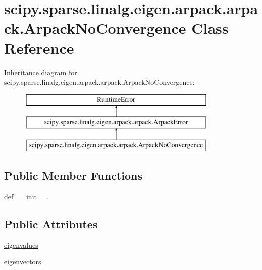 \hypertarget{classscipy_1_1sparse_1_1linalg_1_1eigen_1_1arpack_1_1arpack_1_1ArpackNoConvergence}{}\section{scipy.\+sparse.\+linalg.\+eigen.\+arpack.\+arpack.\+Arpack\+No\+Convergence Class Reference}
\label{classscipy_1_1sparse_1_1linalg_1_1eigen_1_1arpack_1_1arpack_1_1ArpackNoConvergence}
Inheritance diagram for scipy.\+sparse.\+linalg.\+eigen.\+arpack.\+arpack.\+Arpack\+No\+Convergence\+:\begin{figure}[H]
\begin{center}
\leavevmode
\includegraphics[height=3.000000cm]{classscipy_1_1sparse_1_1linalg_1_1eigen_1_1arpack_1_1arpack_1_1ArpackNoConvergence}
\end{center}
\end{figure}
\subsection*{Public Member Functions}
\begin{DoxyCompactItemize}
\item 
def \hyperlink{classscipy_1_1sparse_1_1linalg_1_1eigen_1_1arpack_1_1arpack_1_1ArpackNoConvergence_acea480ae403e6a2c2fca9fd263473918}{\+\_\+\+\_\+init\+\_\+\+\_\+}
\end{DoxyCompactItemize}
\subsection*{Public Attributes}
\begin{DoxyCompactItemize}
\item 
\hyperlink{classscipy_1_1sparse_1_1linalg_1_1eigen_1_1arpack_1_1arpack_1_1ArpackNoConvergence_a0a63a559f1f44c299e18808434917a84}{eigenvalues}
\item 
\hyperlink{classscipy_1_1sparse_1_1linalg_1_1eigen_1_1arpack_1_1arpack_1_1ArpackNoConvergence_a61dc4b4d534293bca4cecc25149c9ad3}{eigenvectors}
\end{DoxyCompactItemize}



